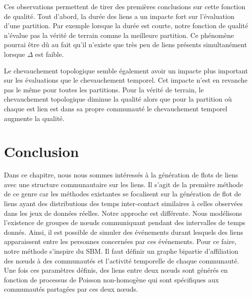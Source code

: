 Ces observations permettent de tirer des premières conclusions sur cette fonction de qualité.
Tout d'abord, la durée des liens a un impacte fort sur l'évaluation d'une partition.
Par exemple lorsque la durée est courte, notre fonction de qualité n'évalue pas la vérité de terrain comme la meilleure partition.
Ce phénomène pourrai être dû au fait qu'il n'existe que très peu de liens présents simultanément lorsque $\Delta$ est faible.

Le chevauchement topologique semble également avoir un impacte plus important sur les évaluations que le chevauchement temporel.
Cet impacte n'est en revanche pas le même pour toutes les partitions.
Pour la vérité de terrain, le chevauchement topologique diminue la qualité alors que pour la partition où chaque est lien est dans sa propre communauté le chevauchement temporel augmente la qualité.


\section{Conclusion}

Dans ce chapitre, nous nous sommes intéressés à la génération de flots de liens avec une structure communautaire sur les liens.
Il s'agit de la première méthode de ce genre car les méthodes existantes se focalisent sur la génération de flot de liens ayant des distributions des temps inter-contact similaires à celles observées dans les jeux de données réelles.
Notre approche est différente.
Nous modélisons l'existence de groupes de n\oe uds communiquant pendant des intervalles de temps donnés.
Ainsi, il est possible de simuler des événements durant lesquels des liens apparaissent entre les personnes concernées par ces événements.
Pour ce faire, notre méthode s'inspire du SBM.
Il faut définir un graphe bipartie d'affiliation des n\oe uds à des communautés et l'activité temporelle de chaque communauté.
Une fois ces paramètres définis, des liens entre deux n\oe uds sont générés en fonction de processus de Poisson non-homogène qui sont spécifiques aux communautés partagées par ces deux n\oe uds.

